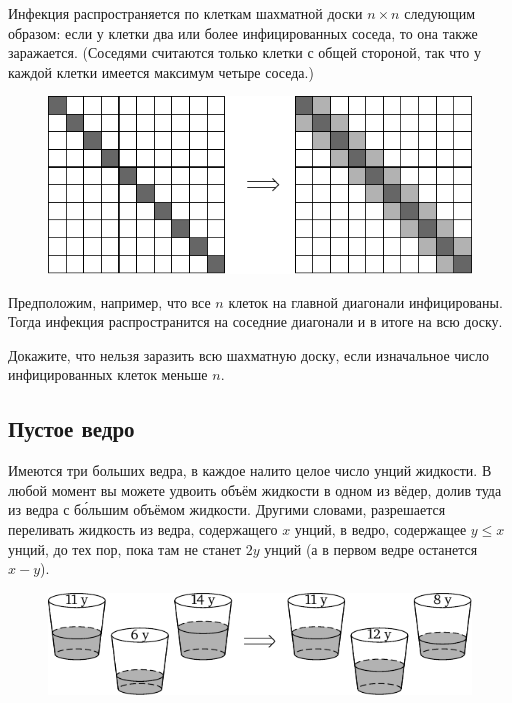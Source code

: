 \documentclass[twoside]{book}
\makeatletter
\newcommand{\rindex}[2][\imki@jobname]{%
\index[#1]{\detokenize{#2}}%
}
\makeatother
\begin{document}
Инфекция распространяется по клеткам шахматной доски $n \times n$ следующим образом: если у клетки два или более инфицированных соседа, то она также заражается.
(Соседями считаются только клетки с общей стороной, так что у каждой клетки имеется максимум четыре соседа.)

\begin{figure}[!ht]
\centering
\includegraphics{mp/wink-17}
\end{figure}

Предположим, например, что все $n$ клеток на главной диагонали инфицированы.
Тогда инфекция распространится на соседние диагонали и в итоге на всю доску.

Докажите, что нельзя заразить всю шахматную доску, если изначальное число инфицированных клеток меньше $n$.

\subsection*{Пустое ведро}%
\rindex{Пустое ведро}

Имеются три больших ведра, в каждое налито целое число унций жидкости.
В любой момент вы можете удвоить объём жидкости в одном из вёдер, долив туда из ведра с б\'{о}льшим объёмом жидкости.
Другими словами, разрешается переливать жидкость из ведра, содержащего $x$ унций, в ведро, содержащее 
$y\le x$ унций, до тех пор, пока там не станет $2y$ унций (а в первом ведре останется $x-y$).

\begin{figure}[!ht]
\centering
\includegraphics{mp/wink-18}
\end{figure}
\end{document}
